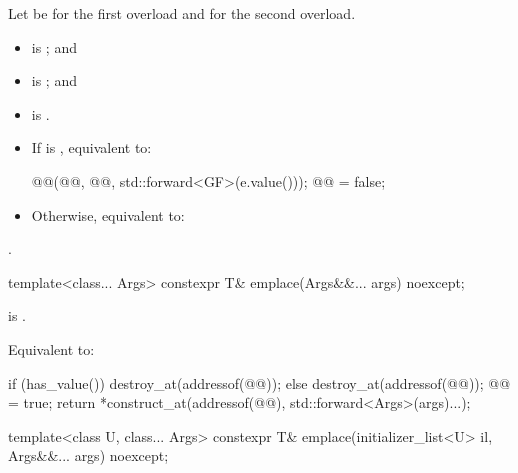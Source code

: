 \begin{itemdescr}
\pnum
Let  be  for the first overload and
 for the second overload.

\pnum
\constraints
\begin{itemize}
\item
{} is ; and
\item
{} is ; and
\item
{} is .
\end{itemize}

\pnum
\effects
\begin{itemize}
\item
If  is , equivalent to:
\begin{codeblock}
@@(@@, @@, std::forward<GF>(e.value()));
@@ = false;
\end{codeblock}
\item
Otherwise, equivalent to:
\end{itemize}

\pnum
\returns
{}.
\end{itemdescr}

%
\begin{itemdecl}
template<class... Args>
  constexpr T& emplace(Args&&... args) noexcept;
\end{itemdecl}

\begin{itemdescr}
\pnum
\constraints
{} is .

\pnum
\effects
Equivalent to:
\begin{codeblock}
if (has_value()) {
  destroy_at(addressof(@@));
} else {
  destroy_at(addressof(@@));
  @@ = true;
}
return *construct_at(addressof(@@), std::forward<Args>(args)...);
\end{codeblock}
\end{itemdescr}

%
\begin{itemdecl}
template<class U, class... Args>
  constexpr T& emplace(initializer_list<U> il, Args&&... args) noexcept;
\end{itemdecl}

